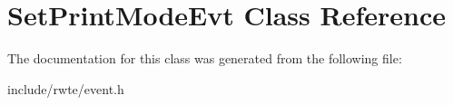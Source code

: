 \hypertarget{classSetPrintModeEvt}{}\section{Set\+Print\+Mode\+Evt Class Reference}
\label{classSetPrintModeEvt}


The documentation for this class was generated from the following file\+:\begin{DoxyCompactItemize}
\item 
include/rwte/event.\+h\end{DoxyCompactItemize}
